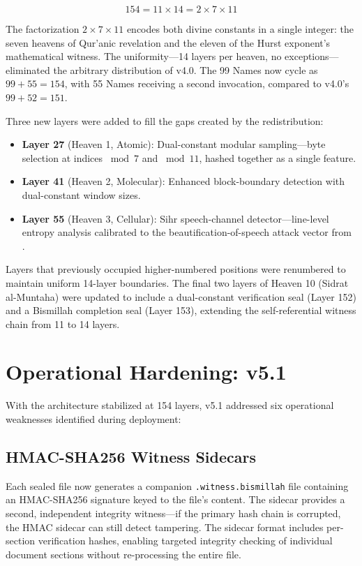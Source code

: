 \documentclass[11pt,a4paper]{article}
\begin{document}
\begin{equation}
154 = 11 \times 14 = 2 \times 7 \times 11
\end{equation}

The factorization $2 \times 7 \times 11$ encodes both divine constants in a single integer: the seven heavens of Qur'anic revelation and the eleven of the Hurst exponent's mathematical witness. The uniformity---14 layers per heaven, no exceptions---eliminated the arbitrary distribution of v4.0. The 99 Names now cycle as $99 + 55 = 154$, with 55 Names receiving a second invocation, compared to v4.0's $99 + 52 = 151$.

Three new layers were added to fill the gaps created by the redistribution:

\begin{itemize}[nosep]
    \item \textbf{Layer 27} (Heaven 1, Atomic): Dual-constant modular sampling---byte selection at indices $\bmod 7$ and $\bmod 11$, hashed together as a single feature.
    \item \textbf{Layer 41} (Heaven 2, Molecular): Enhanced block-boundary detection with dual-constant window sizes.
    \item \textbf{Layer 55} (Heaven 3, Cellular): Sihr speech-channel detector---line-level entropy analysis calibrated to the beautification-of-speech attack vector from \cite{arfeen2026sihr}.
\end{itemize}

Layers that previously occupied higher-numbered positions were renumbered to maintain uniform 14-layer boundaries. The final two layers of Heaven 10 (Sidrat al-Muntaha) were updated to include a dual-constant verification seal (Layer 152) and a Bismillah completion seal (Layer 153), extending the self-referential witness chain from 11 to 14 layers.


\section{Operational Hardening: v5.1}

With the architecture stabilized at 154 layers, v5.1 addressed six operational weaknesses identified during deployment:

\subsection{HMAC-SHA256 Witness Sidecars}
Each sealed file now generates a companion \texttt{.witness.bismillah} file containing an HMAC-SHA256 signature keyed to the file's content. The sidecar provides a second, independent integrity witness---if the primary hash chain is corrupted, the HMAC sidecar can still detect tampering. The sidecar format includes per-section verification hashes, enabling targeted integrity checking of individual document sections without re-processing the entire file.
\end{document}
